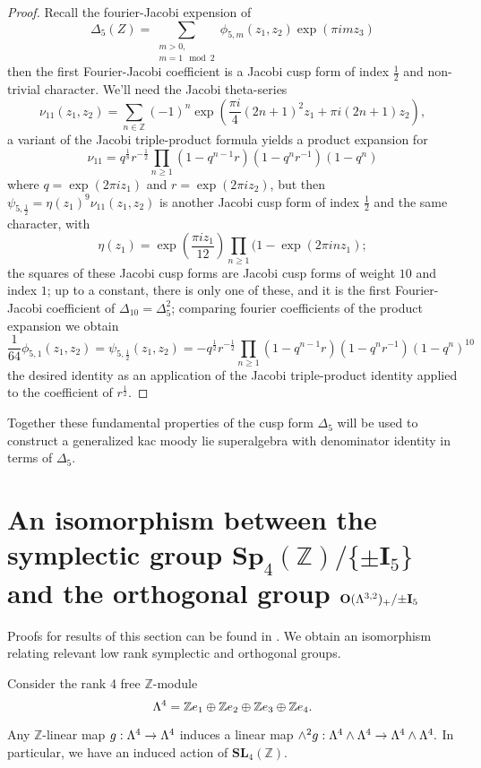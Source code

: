 \documentclass[9pt]{amsart} \usepackage[utf8]{inputenc}
\newcommand{\Z}{\mathbb{Z}} \newcommand{\C}{\mathbb{C}}
\newcommand{\Sp}{\mathbf{Sp}}
\newcommand{\SL}{\mathbf{SL}}
\newcommand{\Orth}{\mathbf{O}}
\newcommand{\Id}{\mathbf{I}}
\begin{document}
\begin{proof}
Recall the fourier-Jacobi expension of $$\Delta_5(Z) =
\displaystyle\sum_{\substack{m>0,\\m = 1
\mod 2}} \phi_{5,m} (z_1,z_2)\exp (\pi i m z_3)$$
then the first Fourier-Jacobi coefficient is a Jacobi cusp form of index
$\frac{1}{2}$ and non-trivial character. We'll need the Jacobi
theta-series $$\nu_{11}(z_1,z_2) = \displaystyle\sum_{n \in \Z} (-1)^n \exp(\frac{\pi
i}{4} (2n + 1)^2 z_1 + \pi i(2n +1) z_2),$$ a variant of the Jacobi
triple-product formula yields a product expansion for $$\nu_{11} =
q^{\frac{1}{8}}r^{-\frac{1}{2}} \displaystyle\prod_{n \geq 1} (1 - q^{n-1} r ) (1 - q^n
r^{-1}) (1 -q^n)$$ where $q = \exp(2\pi i z_1)$ and $r = \exp(2\pi i
z_2)$, but
then $\psi_{5,\frac{1}{2}} = \eta(z_1)^9 \nu_{11}(z_1,z_2)$ is another
Jacobi cusp form of index $\frac{1}{2}$ and the same character, with
$$\eta(z_1) = \exp(\frac{\pi i z_1}{12}) \displaystyle\prod_{n\geq 1} (1 - \exp(2\pi i n
z_1);$$ the
squares of these Jacobi cusp forms are Jacobi cusp forms of weight $10$
and index $1$; up to a constant, there is only one of these, and it is
the first Fourier-Jacobi coefficient of $\Delta_{10} = \Delta_5^2$;
comparing fourier coefficients of the product expansion we obtain $$\frac{1}{64}
\phi_{5,1}(z_1,z_2) = \psi_{5,\frac{1}{2}}(z_1,z_2) =
-q^{\frac{1}{2}}r^{-\frac{1}{2}}\displaystyle\prod_{n\geq 1} (1 - q^{n-1}r )(1 -q^n
r^{-1})(1 - q^n)^{10}$$ the
desired identity as an application of the Jacobi triple-product identity
applied to the coefficient of $r^{\frac{1}{2}}$.
\end{proof}
Together these fundamental properties of the cusp form $\Delta_5$
will be used to construct a generalized kac moody lie superalgebra with
denominator identity in terms of $\Delta_5$.


\section{An isomorphism between
the symplectic group $\Sp_4(\Z)/\{\pm\Id_5\}$ and the orthogonal group
$\Orth(\La^{3,2})_+/{\pm\Id_5}$}

Proofs for results of this section can be found in \cite{KNAPP:1}. We
obtain an isomorphism relating relevant low rank symplectic and
orthogonal groups.


Consider the rank 4 free $\Z$-module $$\La^4 = \Z e_1 \oplus \Z e_2
\oplus \Z e_3 \oplus \Z e_4.$$

Any $\Z$-linear map $g: \Lambda^4 \rightarrow \Lambda^4$ induces a linear map
$\wedge^2 g : \Lambda^4 \wedge \Lambda^4 \rightarrow \Lambda^4 \wedge \Lambda^4.$ In
particular, we have an induced action of $\SL_4(\Z)$.
\end{document}
